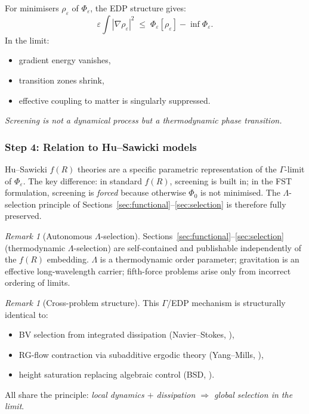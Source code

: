 \documentclass[12pt,a4paper]{article}
\theoremstyle{definition}
\theoremstyle{plain}
\theoremstyle{remark}
\newtheorem{remark}[definition]{Remark}
\begin{document}
For minimisers $\rho_\varepsilon$ of $\Phi_\varepsilon$, the EDP structure gives:
\begin{equation}\label{eq:edp-screening}
  \varepsilon \int |\nabla\rho_\varepsilon|^2 \;\leq\; \Phi_\varepsilon[\rho_\varepsilon] - \inf\Phi_\varepsilon.
\end{equation}
In the limit:
\begin{itemize}
\item gradient energy vanishes,
\item transition zones shrink,
\item effective coupling to matter is singularly suppressed.
\end{itemize}
\emph{Screening is not a dynamical process but a thermodynamic phase transition.}

\subsubsection*{Step 4: Relation to Hu--Sawicki models}

Hu--Sawicki $f(R)$ theories are a specific parametric representation of the $\Gamma$-limit of $\Phi_\varepsilon$. The key difference: in standard $f(R)$, screening is built in; in the FST formulation, screening is \emph{forced} because otherwise $\Phi_0$ is not minimised. The $\Lambda$-selection principle of Sections~\ref{sec:functional}--\ref{sec:selection} is therefore fully preserved.

\begin{remark}[Autonomous $\Lambda$-selection]\label{rem:autonomous-lambda}
Sections~\ref{sec:functional}--\ref{sec:selection} (thermodynamic $\Lambda$-selection) are self-contained and publishable independently of the $f(R)$ embedding. $\Lambda$ is a thermodynamic order parameter; gravitation is an effective long-wavelength carrier; fifth-force problems arise only from incorrect ordering of limits.
\end{remark}

\begin{remark}[Cross-problem structure]\label{rem:cross-edp-de}
This $\Gamma$/EDP mechanism is structurally identical to:
\begin{itemize}
\item BV selection from integrated dissipation (Navier--Stokes, \cite{FST-NS2026}),
\item RG-flow contraction via subadditive ergodic theory (Yang--Mills, \cite{Geiger2026-YM}),
\item height saturation replacing algebraic control (BSD, \cite{Geiger2026-BSD}).
\end{itemize}
All share the principle: \emph{local dynamics $+$ dissipation $\Rightarrow$ global selection in the limit}.
\end{remark}
\end{document}
